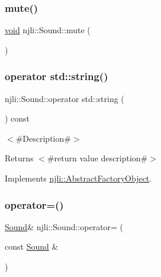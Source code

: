\mbox{\label{classnjli_1_1_sound_adf46d412ea87b44a16190049b74a18ff}} 
\subsubsection{\texorpdfstring{mute()}{mute()}}
{\footnotesize\ttfamily \mbox{\hyperlink{_thread_8h_af1e856da2e658414cb2456cb6f7ebc66}{void}} njli\+::\+Sound\+::mute (\begin{DoxyParamCaption}{ }\end{DoxyParamCaption})}

\mbox{\label{classnjli_1_1_sound_af27e59803f8b7136d71375cfb51620ac}} 
\subsubsection{\texorpdfstring{operator std\+::string()}{operator std::string()}}
{\footnotesize\ttfamily njli\+::\+Sound\+::operator std\+::string (\begin{DoxyParamCaption}{ }\end{DoxyParamCaption}) const\hspace{0.3cm}{\ttfamily [virtual]}}

$<$\#\+Description\#$>$

\begin{DoxyReturn}{Returns}
$<$\#return value description\#$>$ 
\end{DoxyReturn}


Implements \mbox{\hyperlink{classnjli_1_1_abstract_factory_object_a838f4fa7e65cace6098aab5222892942}{njli\+::\+Abstract\+Factory\+Object}}.

\mbox{\label{classnjli_1_1_sound_aeaf2801406eac8f11345eb664816e61d}} 
\subsubsection{\texorpdfstring{operator=()}{operator=()}}
{\footnotesize\ttfamily \mbox{\hyperlink{classnjli_1_1_sound}{Sound}}\& njli\+::\+Sound\+::operator= (\begin{DoxyParamCaption}\item[{const \mbox{\hyperlink{classnjli_1_1_sound}{Sound}} \&}]{ }\end{DoxyParamCaption})\hspace{0.3cm}{\ttfamily [protected]}}

